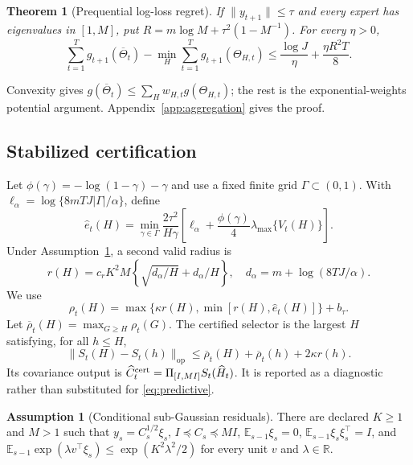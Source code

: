 \documentclass{article}
\newtheorem{theorem}{Theorem}
\theoremstyle{definition}
\newtheorem{assumption}{Assumption}
\theoremstyle{remark}
\newcommand{\R}{\mathbb R}
\newcommand{\E}{\mathbb E}
\newcommand{\op}{\mathrm{op}}
\begin{document}
\begin{theorem}[Prequential log-loss regret]
\label{thm:regret}
If $\|y_{t+1}\|\le\tau$ and every expert has eigenvalues in $[1,M]$, put
$R=m\log M+\tau^2(1-M^{-1})$.  For every $\eta>0$,
\begin{equation}
 \sum_{t=1}^Tg_{t+1}(\overline\Theta_t)-
 \min_H\sum_{t=1}^Tg_{t+1}(\Theta_{H,t})
 \le\frac{\log J}{\eta}+\frac{\eta R^2T}{8}.
 \label{eq:regret}
\end{equation}
\end{theorem}

Convexity gives $g(\overline\Theta_t)\le\sum_Hw_{H,t}g(\Theta_{H,t})$; the rest is the exponential-weights potential argument.  Appendix~\ref{app:aggregation} gives the proof.

\subsection{Stabilized certification}

Let $\phi(\gamma)=-\log(1-\gamma)-\gamma$ and use a fixed finite grid $\Gamma\subset(0,1)$.  With $\ell_\alpha=\log\{8mTJ|\Gamma|/\alpha\}$, define
\begin{equation}
 \widehat e_t(H)=\min_{\gamma\in\Gamma}
 \frac{2\tau^2}{H\gamma}
 \left[\ell_\alpha+\frac{\phi(\gamma)}4\lambda_{\max}\{V_t(H)\}\right].
 \label{eq:emp-radius}
\end{equation}
Under Assumption~\ref{ass:sg}, a second valid radius is
\begin{equation}
 r(H)=c_rK^2M\left\{\sqrt{d_\alpha/H}+d_\alpha/H\right\},\quad
 d_\alpha=m+\log(8TJ/\alpha).
 \label{eq:det-radius}
\end{equation}
We use
\begin{equation}
 \rho_t(H)=\max\{\kappa r(H),\min[r(H),\widehat e_t(H)]\}+b_\tau.
 \label{eq:stabilized-radius}
\end{equation}
Let $\overline\rho_t(H)=\max_{G\ge H}\rho_t(G)$.  The certified selector is the largest $H$ satisfying, for all $h\le H$,
\begin{equation}
 \|S_t(H)-S_t(h)\|_{\op}
 \le\overline\rho_t(H)+\overline\rho_t(h)+2\kappa r(h).
 \label{eq:selector}
\end{equation}
Its covariance output is $\widehat C_t^{\rm cert}=\Pi_{[I,MI]}S_t(\widehat H_t)$.  It is reported as a diagnostic rather than substituted for \eqref{eq:predictive}.

\begin{assumption}[Conditional sub-Gaussian residuals]
\label{ass:sg}
There are declared $K\ge1$ and $M>1$ such that $y_s=C_s^{1/2}\xi_s$, $I\preceq C_s\preceq MI$, $\E_{s-1}\xi_s=0$, $\E_{s-1}\xi_s\xi_s^\top=I$, and
$\E_{s-1}\exp(\lambda v^\top\xi_s)\le\exp(K^2\lambda^2/2)$ for every unit $v$ and $\lambda\in\R$.
\end{assumption}
\end{document}
